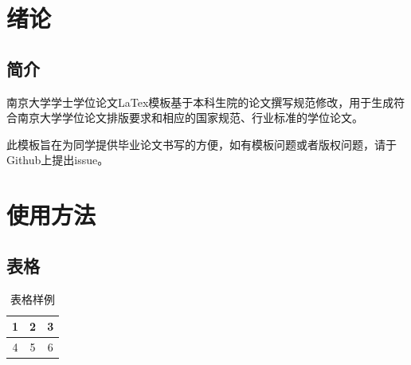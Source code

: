 \documentclass[
    TitleLength = 1,%
]{njuthesis}
\begin{document}
\maketitle



\tableofcontents
\mainmatter

\chapter{绪论}
    \section{简介}
    南京大学学士学位论文LaTex模板\cite{njuthesis}基于本科生院的论文撰写规范修改，用于生成符合南京大学学位论文排版要求和相应的国家规范、行业标准的学位论文。

    此模板旨在为同学提供毕业论文书写的方便，如有模板问题或者版权问题，请于Github上提出issue。
\chapter{使用方法}
    \section{表格}
    \begin{table}[htbp]
        \centering
        \caption{表格样例}
        \begin{tabular}{|c|c|c|}
            \hline
            1 & 2 & 3 \\
            \hline
            4 &  5 & 6 \\
            \hline
        \end{tabular}
    \end{table}
\end{document}
